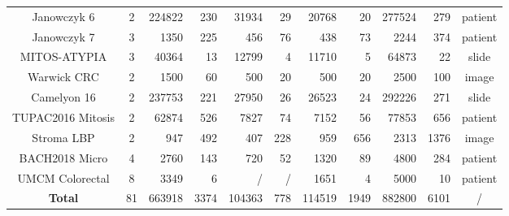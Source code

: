 \begin{table*}[t]
\begin{tabular}{|c|c|r:r|r:r|r:r|r:r|c|}
Janowczyk 6 & 2 & 224822 & 230 & 31934 & 29 & 20768 & 20 & 277524 & 279 & patient \\
Janowczyk 7 & 3 & 1350 & 225 & 456 & 76 & 438 & 73 & 2244 & 374 & patient \\
MITOS-ATYPIA & 3 & 40364 & 13 & 12799 & 4 & 11710 & 5 & 64873 & 22 & slide \\
Warwick CRC & 2 & 1500 & 60 & 500 & 20 & 500 & 20 & 2500 & 100 & image \\
Camelyon 16 & 2 & 237753 & 221 & 27950 & 26 & 26523 & 24 & 292226 & 271 & slide\\
TUPAC2016 Mitosis & 2 & 62874 & 526 & 7827 & 74 & 7152 & 56 & 77853 & 656 & patient \\
Stroma LBP & 2 & 947 & 492 & 407 & 228 & 959 & 656 & 2313 & 1376 & image \\
BACH2018 Micro & 4 & 2760 & 143 & 720 & 52 & 1320 & 89 & 4800 & 284 & patient \\
UMCM Colorectal & 8 & 3349 & 6 & / & / & 1651 & 4 & 5000 & 10 & patient \\
\hline
\textbf{Total} & 81 & 663918 & 3374 & 104363 & 778 & 114519 & 1949 & 882800 & 6101 & / \\
\hline
    \end{tabular}
\end{table*}

